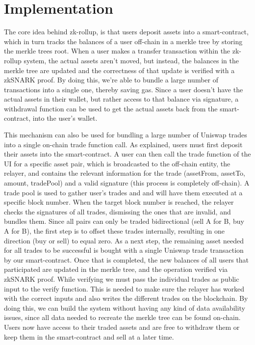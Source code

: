 \documentclass[runningheads]{llncs}
\begin{document}
\section{Implementation}
The core idea behind zk-rollup, is that users deposit assets into a smart-contract, which in turn tracks the balances of a user off-chain in a merkle tree by storing the merkle trees root. When a user makes a transfer transaction within the zk-rollup system, the actual assets aren't moved, but instead, the balances in the merkle tree are updated and the correctness of that update is verified with a zkSNARK proof. By doing this, we’re able to bundle a large number of transactions into a single one, thereby saving gas. Since a user doesn’t have the actual assets in their wallet, but rather access to that balance via signature, a withdrawal function can be used to get the actual assets back from the smart-contract, into the user's wallet. 

This mechanism can also be used for bundling a large number of  Uniswap trades into a single on-chain trade function call. As explained, users must first deposit their assets into the smart-contract. A user can then call the trade function of the UI for a specific asset pair, which is broadcasted to the off-chain entity, the relayer, and contains the relevant information for the trade (assetFrom, assetTo, amount, tradePool) and a valid signature (this process is completely off-chain). A trade pool is used to gather user's trades and and will have them executed at a specific block number. When the target block number is reached, the relayer checks the signatures of all trades, dismissing the ones that are invalid, and bundles them. Since all pairs can only be traded bidirectional (sell A for B, buy A for B), the first step is to offset these trades internally, resulting in one direction (buy or sell) to equal zero. As a next step, the remaining asset needed for all trades to be successful is bought with a single Uniswap trade transaction by our smart-contract. Once that is completed, the new balances of all users that participated are updated in the merkle tree, and the operation verified via zkSNARK proof. While verifying we must pass the individual trades as public input to the verify function. This is needed to make sure the relayer has worked with the correct inputs and also writes the different trades on the blockchain. By doing this, we can build the system without having any kind of data availability issues, since all data needed to recreate the merkle tree can be found on-chain. Users now have access to their traded assets and are free to withdraw them or keep them in the smart-contract and sell at a later time.
\end{document}
